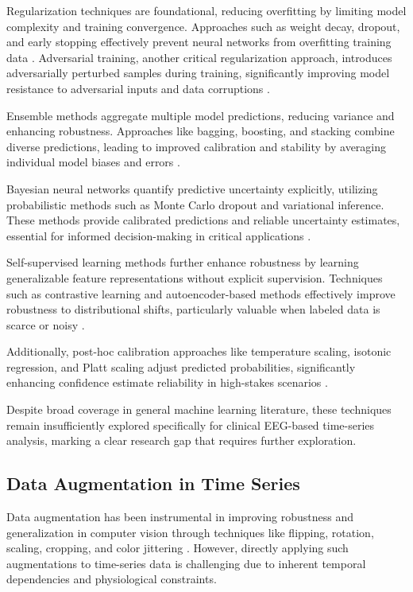 Regularization techniques are foundational, reducing overfitting by limiting model complexity and training convergence. Approaches such as weight decay, dropout, and early stopping effectively prevent neural networks from overfitting training data \cite{srivastava2014dropout, krogh1992simple}. Adversarial training, another critical regularization approach, introduces adversarially perturbed samples during training, significantly improving model resistance to adversarial inputs and data corruptions \cite{madry2017towards}.

Ensemble methods aggregate multiple model predictions, reducing variance and enhancing robustness. Approaches like bagging, boosting, and stacking combine diverse predictions, leading to improved calibration and stability by averaging individual model biases and errors \cite{lakshminarayanan2017simple}.

Bayesian neural networks quantify predictive uncertainty explicitly, utilizing probabilistic methods such as Monte Carlo dropout and variational inference. These methods provide calibrated predictions and reliable uncertainty estimates, essential for informed decision-making in critical applications \cite{gal2016dropout, blundell2015weight}.

Self-supervised learning methods further enhance robustness by learning generalizable feature representations without explicit supervision. Techniques such as contrastive learning and autoencoder-based methods effectively improve robustness to distributional shifts, particularly valuable when labeled data is scarce or noisy \cite{chen2020simple, grill2020bootstrap}.

Additionally, post-hoc calibration approaches like temperature scaling, isotonic regression, and Platt scaling adjust predicted probabilities, significantly enhancing confidence estimate reliability in high-stakes scenarios \cite{guo2017calibration}.

Despite broad coverage in general machine learning literature, these techniques remain insufficiently explored specifically for clinical EEG-based time-series analysis, marking a clear research gap that requires further exploration.

\subsection{Data Augmentation in Time Series}
Data augmentation has been instrumental in improving robustness and generalization in computer vision through techniques like flipping, rotation, scaling, cropping, and color jittering \cite{shorten2019survey}. However, directly applying such augmentations to time-series data is challenging due to inherent temporal dependencies and physiological constraints.

